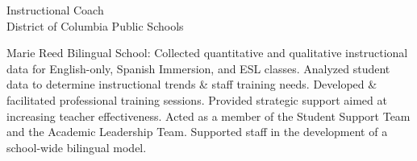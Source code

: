 \documentclass[]{scrartcl}
\begin{document}
\begin{cleanCV}
{Instructional Coach}
{\\District of Columbia Public Schools}

\JobDesc{}
{Marie Reed Bilingual School: Collected quantitative and qualitative instructional data for English-only, Spanish Immersion, and ESL classes. Analyzed student data to determine instructional trends \& staff training needs. Developed \& facilitated professional training sessions. Provided strategic support aimed at increasing teacher effectiveness. Acted as a member of the  Student Support Team and the Academic Leadership Team. Supported staff in the development of a school-wide bilingual model.}





  





\end{cleanCV}
\end{document}
